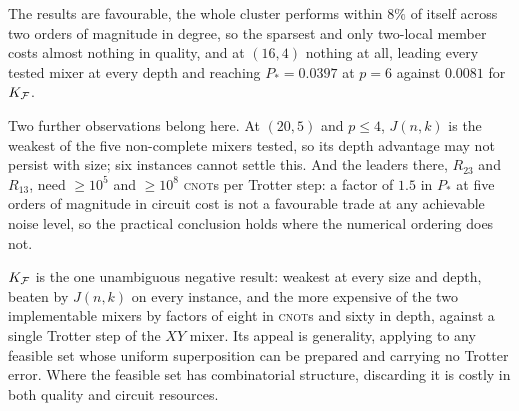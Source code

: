 The results are favourable, the whole cluster performs within $8\%$ of itself across two orders of magnitude in degree, so the sparsest and only two-local member costs almost nothing in quality, and at $(16,4)$ nothing at all, leading every tested mixer at every depth and reaching $P_*=0.0397$ at $p=6$ against $0.0081$ for $K_{\mathcal{F}}$.

Two further observations belong here. At $(20,5)$ and $p\le4$, $J(n,k)$ is the weakest of the five non-complete mixers tested, so its depth advantage may not persist with size; six instances cannot settle this. And the leaders there, $R_{23}$ and $R_{13}$, need $\ge10^{5}$ and $\ge10^{8}$ \textsc{cnot}s per Trotter step: a factor of $1.5$ in $P_*$ at five orders of magnitude in circuit cost is not a favourable trade at any achievable noise level, so the practical conclusion holds where the numerical ordering does not.

$K_{\mathcal{F}}$ is the one unambiguous negative result: weakest at every size and depth, beaten by $J(n,k)$ on every instance, and the more expensive of the two implementable mixers by factors of eight in \textsc{cnot}s and sixty in depth, against a single Trotter step of the $XY$ mixer. Its appeal is generality, applying to any feasible set whose uniform superposition can be prepared and carrying no Trotter error. Where the feasible set has combinatorial structure, discarding it is costly in both quality and circuit resources.